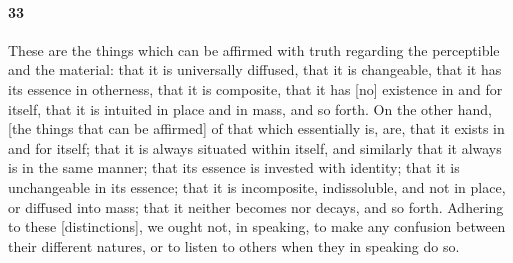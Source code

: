 \documentclass[12pt]{article}
\begin{document}
\paragraph{33} These are the things which can be affirmed with truth regarding
the perceptible and the material: that it is universally diffused, that it is
changeable, that it has its es\-sence in otherness, that it is composite, that
it has [no] existence in and for itself, that it is intuited in place and in
mass, and so forth. On the other hand, [the things that can be affirmed] of
that which essentially is, are, that it exists in and for itself; that it is
always situated within itself, and similarly that it always is in the same
manner; that its es\-sence is invested with identity; that it is unchangeable
in its es\-sence; that it is incomposite, indissoluble, and not in place, or
diffused into mass; that it neither becomes nor decays, and so forth. Adhering
to these [distinctions], we ought not, in speaking, to make any confusion
between their different natures, or to listen to others when they in speaking
do so.
\end{document}

